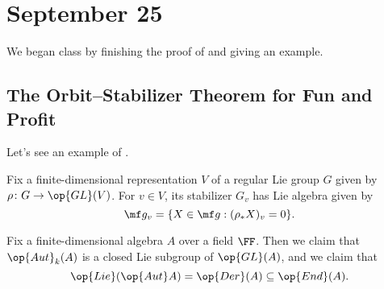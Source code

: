 \documentclass[../notes.tex]{subfiles}
\begin{document}
\section{September 25}
We began class by finishing the proof of  and giving an example.

\subsection{The Orbit--Stabilizer Theorem for Fun and Profit}
Let's see an example of .
\begin{example}
	Fix a finite-dimensional representation $V$ of a regular Lie group $G$ given by $\rho\colon G\to\op{GL}(V)$. For $v\in V$, its stabilizer $G_v$ has Lie algebra given by
	\[\mf g_v=\{X\in\mf g:(\rho_*X)_v=0\}.\]
\end{example}
\begin{example}
	Fix a finite-dimensional algebra $A$ over a field $\FF$. Then we claim that $\op{Aut}_k(A)$ is a closed Lie subgroup of $\op{GL}(A)$, and we claim that
	\[\op{Lie}(\op{Aut}A)=\op{Der}(A)\subseteq\op{End}(A).\]
\end{example}
\end{document}
